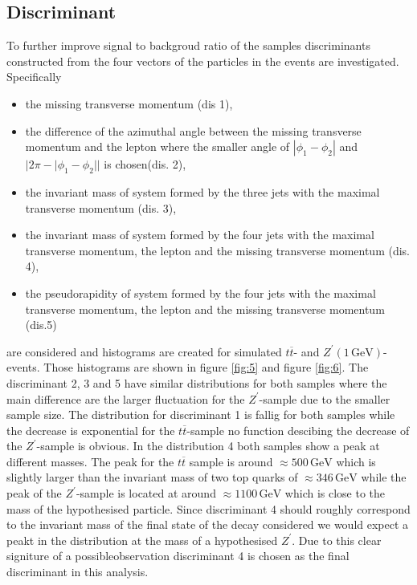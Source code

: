 \subsection{Discriminant}
To further improve signal to backgroud ratio of the samples discriminants constructed from the four vectors of the particles in the events are investigated. 
Specifically 
\begin{itemize}
  \item the missing transverse momentum (dis 1),
  \item the difference of the azimuthal angle between the missing transverse momentum and the lepton where the smaller angle of $|\phi_1 - \phi_2|$ and 
  $|2 \pi - |\phi_1 -\phi_2||$ is chosen(dis. 2), 
  \item the invariant mass of system formed by the three jets with the maximal transverse momentum (dis. 3),
  \item the invariant mass of system formed by the four jets with the maximal transverse momentum, the lepton and the missing transverse momentum (dis. 4), 
  \item the pseudorapidity of system formed by the four jets with the maximal transverse momentum, the lepton and the missing transverse momentum (dis.5) 
\end{itemize}
are considered and histograms are created for simulated $t \overline{t}$- and $Z^\prime(1 \, \si{\giga\eV})$-events. Those histograms are shown in figure 
\ref{fig:5} and figure \ref{fig:6}. The discriminant 2, 3 and 5 have similar distributions for both samples where the main difference are the larger fluctuation 
for the $Z^\prime$-sample due to the smaller sample size. The distribution for discriminant 1 is fallig for both samples while the decrease is exponential 
for the $t \overline{t}$-sample no function descibing the decrease of the $Z^\prime$-sample is obvious. In the distribution 4 both samples show a peak 
at different masses. The peak for the $t \overline{t}$ sample is around $\approx 500 \, \si{\giga\eV}$ which is slightly larger than the invariant mass of 
two top quarks of $\approx 346 \, \si{\giga\eV}$ while the peak of the $Z^\prime$-sample is located at around $\approx 1100 \, \si{\giga\eV}$ which is close to the mass of the 
hypothesised particle. Since discriminant 4 should roughly correspond to the invariant mass of the final state of the decay considered we would expect 
a peakt in the distribution at the mass of a hypothesised $Z^\prime$. Due to this clear signiture of a possibleobservation discriminant 4 is chosen as 
the final discriminant in this analysis.


